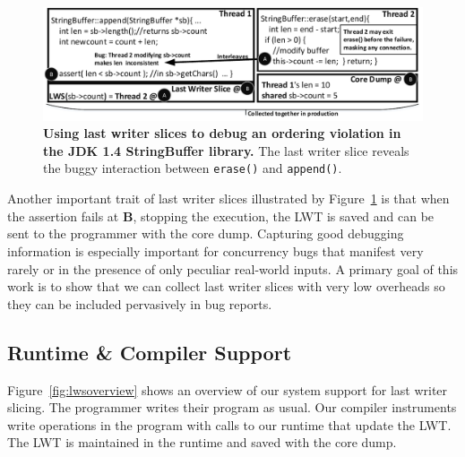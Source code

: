 \documentclass[10pt,nocopyrightspace]{sigplanconf}
\newcommand{\lwt}{LWT\xspace}
\newcommand{\Caption}[1]{\begin{minipage}{.95\columnwidth} \caption{#1} \end{minipage} \vspace{-1.2ex}}
\begin{document}


\begin{figure}[h]
\centering
\includegraphics[width=\columnwidth]{figs/JDKStringBufferDebug2.pdf}
\Caption{\label{fig:jdklws}{\bf Using last writer slices to debug an
ordering violation in the JDK 1.4 StringBuffer library.} The last writer slice reveals the buggy interaction between {\tt erase()} and {\tt append()}.}
\end{figure}


Another important trait of last writer slices illustrated by
Figure~\ref{fig:jdklws} is that when the assertion fails at {\bf B}, stopping
the execution, the \lwt is saved and can be sent to the programmer with the
core dump.  Capturing good debugging information is especially important for
concurrency bugs that manifest very rarely or in the presence of only peculiar
real-world inputs.  A primary goal of this work is to show that we can collect
last writer slices with very low overheads so they can be included pervasively
in bug reports.


\subsection{Runtime \& Compiler Support}

Figure~\ref{fig:lwsoverview} shows an overview of our system support for last
writer slicing.  The programmer writes their program as usual. Our compiler
instruments write operations in the program with calls to our runtime that
update the \lwt.  The \lwt is maintained in the runtime and saved with the core dump. 
\end{document}
